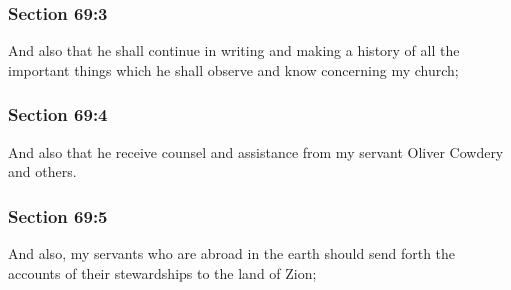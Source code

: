 
	\subsubsection{Section 69:3} %
		\label{DC69-3}

		And also that he shall continue in writing and making a history of all the important things which he shall observe and know concerning my church;


	\subsubsection{Section 69:4} %
		\label{DC69-4}

		And also that he receive counsel and assistance from my servant Oliver Cowdery and others.


	\subsubsection{Section 69:5} %
		\label{DC69-5}

		And also, my servants who are abroad in the earth should send forth the accounts of their stewardships to the land of Zion;


